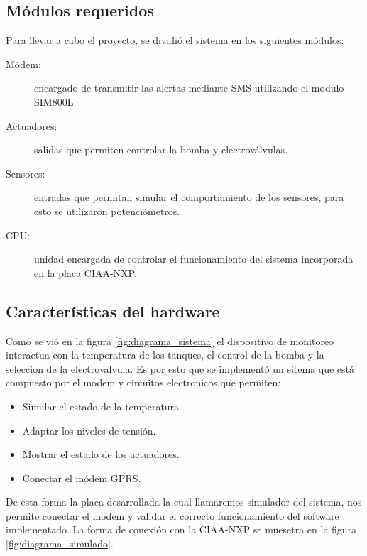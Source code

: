 \subsection{ Módulos requeridos}
Para llevar a cabo el proyecto, se dividió el sistema en los siguientes módulos:
\begin{description}
  \item[Módem:] encargado de transmitir las alertas mediante SMS utilizando el modulo SIM800L.
  \item[Actuadores:] salidas que permiten controlar la bomba y electroválvulas.
  \item[Sensores:] entradas que permitan simular el comportamiento de los sensores, para esto se utilizaron potenciómetros.
  \item[CPU:] unidad encargada de controlar el funcionamiento del sistema incorporada en la placa CIAA-NXP. 
\end{description}

\subsection{Características del hardware}
\label{hw_placa}

Como se vió en la figura \ref{fig:diagrama_sistema} el dispositivo de monitoreo interactua con la temperatura de los tanques, el control de la bomba y la seleccion de la electrovalvula. Es por esto que se implementó un sitema que está compuesto por el modem y circuitos electronicos que permiten:
\begin{itemize}
  \item Simular el estado de la temperatura
  \item Adaptar los niveles de tensión.
  \item Mostrar el estado de los actuadores.
  \item Conectar el módem GPRS.
\end{itemize}

    De esta forma la placa desarrollada la cual llamaremos simulador del sistema, nos permite conectar el modem y validar el correcto funcionamiento del software implementado. La forma de conexión con la CIAA-NXP se muesetra en la figura \ref{fig:diagrama_simulado}.

